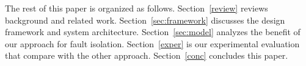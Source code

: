 The rest of this paper is organized as follows.
Section~\ref{review} reviews background and related work.
Section~\ref{sec:framework}  discusses the  design framework and system architecture.
Section~\ref{sec:model}  analyzes the benefit of our approach for fault isolation. 
Section~\ref{exper} is our experimental evaluation that compare with the other approach.
Section~\ref{conc}  concludes this paper.


